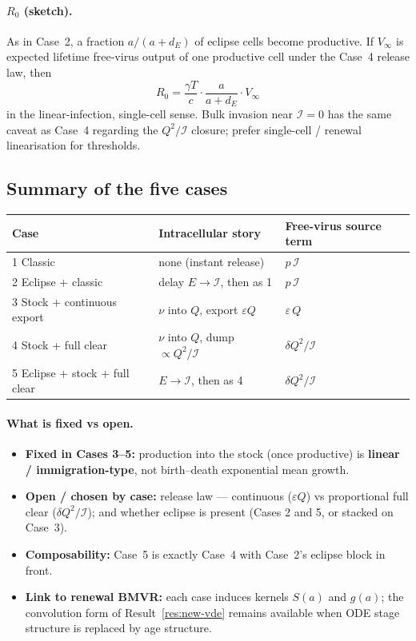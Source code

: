 \documentclass[11pt,a4paper]{article}
\newcommand{\Icell}{\mathcal{I}}
\theoremstyle{plain}
\theoremstyle{definition}
\theoremstyle{remark}
\begin{document}
\paragraph{$R_0$ (sketch).}
As in Case~2, a fraction $a/(a+d_E)$ of eclipse cells become productive. If
$V_\infty$ is expected lifetime free-virus output of one productive cell under
the Case~4 release law, then
\[
R_0
=\frac{\gamma T}{c}\cdot\frac{a}{a+d_E}\cdot V_\infty
\]
in the linear-infection, single-cell sense. Bulk invasion near $\Icell=0$ has
the same caveat as Case~4 regarding the $Q^2/\Icell$ closure; prefer
single-cell / renewal linearisation for thresholds.

\subsection{Summary of the five cases}

\begin{center}
\renewcommand{\arraystretch}{1.3}
\begin{tabular}{@{}p{}p{}p{}@{}}
\toprule
Case & Intracellular story & Free-virus source term \\
\midrule
1 Classic & none (instant release) & $p\,\Icell$ \\
2 Eclipse + classic & delay $E\to\Icell$, then as 1 & $p\,\Icell$ \\
3 Stock + continuous export & $\nu$ into $Q$, export $\varepsilon Q$ & $\varepsilon\,Q$ \\
4 Stock + full clear & $\nu$ into $Q$, dump $\propto Q^2/\Icell$ & $\delta Q^2/\Icell$ \\
5 Eclipse + stock + full clear & $E\to\Icell$, then as 4 & $\delta Q^2/\Icell$ \\
\bottomrule
\end{tabular}
\end{center}

\paragraph{What is fixed vs open.}
\begin{itemize}
\item \textbf{Fixed in Cases 3--5:} production into the stock (once productive)
is \textbf{linear / immigration-type}, not birth--death exponential mean growth.
\item \textbf{Open / chosen by case:} release law --- continuous
($\varepsilon Q$) vs proportional full clear ($\delta Q^2/\Icell$); and whether
eclipse is present (Cases 2 and 5, or stacked on Case~3).
\item \textbf{Composability:} Case~5 is exactly Case~4 with Case~2's eclipse
block in front.
\item \textbf{Link to renewal BMVR:} each case induces kernels $S(a)$ and
$g(a)$; the convolution form of Result~\ref{res:new-vde} remains available when
ODE stage structure is replaced by age structure.
\end{itemize}
\end{document}
